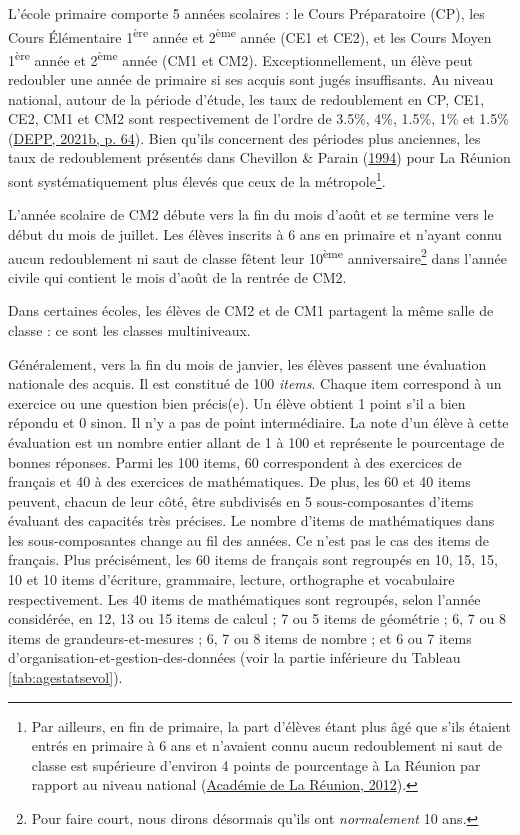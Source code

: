 \documentclass[
]{book}
\begin{document}
\quad L'école primaire comporte 5 années scolaires : le Cours Préparatoire (CP), les Cours Élémentaire 1\textsuperscript{ère} année et 2\textsuperscript{ème} année (CE1 et CE2), et les Cours Moyen 1\textsuperscript{ère} année et 2\textsuperscript{ème} année (CM1 et CM2). Exceptionnellement, un élève peut redoubler une année de primaire si ses acquis sont jugés insuffisants. Au niveau national, autour de la période d'étude, les taux de redoublement en CP, CE1, CE2, CM1 et CM2 sont respectivement de l'ordre de 3.5\%, 4\%, 1.5\%, 1\% et 1.5\% (\protect\hyperlink{ref-DEP:21}{DEPP, 2021b, p. 64}). Bien qu'ils concernent des périodes plus anciennes, les taux de redoublement présentés dans Chevillon \& Parain (\protect\hyperlink{ref-CHE:PAR:94}{1994}) pour La Réunion sont systématiquement plus élevés que ceux de la métropole\footnote{Par ailleurs, en fin de primaire, la part d'élèves étant plus âgé que s'ils étaient entrés en primaire à 6 ans et n'avaient connu aucun redoublement ni saut de classe est supérieure d'environ 4 points de pourcentage à La Réunion par rapport au niveau national (\protect\hyperlink{ref-ACA:12}{Académie de La Réunion, 2012}).}.

\quad L'année scolaire de CM2 débute vers la fin du mois d'août et se termine vers le début du mois de juillet. Les élèves inscrits à 6 ans en primaire et n'ayant connu aucun redoublement ni saut de classe fêtent leur 10\textsuperscript{ème} anniversaire\footnote{Pour faire court, nous dirons désormais qu'ils ont \emph{normalement} 10 ans.} dans l'année civile qui contient le mois d'août de la rentrée de CM2.

\quad Dans certaines écoles, les élèves de CM2 et de CM1 partagent la même salle de classe : ce sont les classes multiniveaux.

\quad Généralement, vers la fin du mois de janvier, les élèves passent une évaluation nationale des acquis. Il est constitué de 100 \emph{items}. Chaque item correspond à un exercice ou une question bien précis(e). Un élève obtient 1 point s'il a bien répondu et 0 sinon. Il n'y a pas de point intermédiaire. La note d'un élève à cette évaluation est un nombre entier allant de 1 à 100 et représente le pourcentage de bonnes réponses.
Parmi les 100 items, 60 correspondent à des exercices de français et 40 à des exercices de mathématiques. De plus, les 60 et 40 items peuvent, chacun de leur côté, être subdivisés en 5 sous-composantes d'items évaluant des capacités très précises. Le nombre d'items de mathématiques dans les sous-composantes change au fil des années. Ce n'est pas le cas des items de français. Plus précisément, les 60 items de français sont regroupés en 10, 15, 15, 10 et 10 items d'écriture, grammaire, lecture, orthographe et vocabulaire respectivement. Les 40 items de mathématiques sont regroupés, selon l'année considérée, en 12, 13 ou 15 items de calcul ; 7 ou 5 items de géométrie ; 6, 7 ou 8 items de grandeurs-et-mesures ; 6, 7 ou 8 items de nombre ; et 6 ou 7 items d'organisation-et-gestion-des-données (voir la partie inférieure du Tableau \ref{tab:agestatsevol}).
\end{document}
